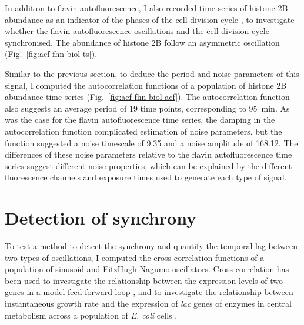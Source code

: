 In addition to flavin autofluorescence, I also recorded time series of histone 2B abundance as an indicator of the phases of the cell division cycle \parencite{garmendia-torresMultipleInputsEnsure2018}, to investigate whether the flavin autofluorescence oscillations and the cell division cycle synchronised.
The abundance of histone 2B follow an asymmetric oscillation (Fig.\ \ref{fig:acf-fhn-biol-ts}).

Similar to the previous section, to deduce the period and noise parameters of this signal, I computed the autocorrelation functions of a population of histone 2B abundance time series (Fig.\ \ref{fig:acf-fhn-biol-acf}).
The autocorrelation function also suggests an average period of 19 time points, corresponding to \SI{95}{\minute}.
As was the case for the flavin autofluorescence time series, the damping in the autocorrelation function complicated estimation of noise parameters, but the function suggested a noise timescale of 9.35 and a noise amplitude of 168.12.
The differences of these noise parameters relative to the flavin autofluorescence time series suggest different noise properties, which can be explained by the different fluorescence channels and exposure times used to generate each type of signal.


\section{Detection of synchrony}
\label{sec:analysis-correlation}

To test a method to detect the synchrony and quantify the temporal lag between two types of oscillations, I computed the cross-correlation functions of a population of sinusoid and FitzHugh-Nagumo oscillators.
Cross-correlation has been used to investigate the relationship between the expression levels of two genes in a model feed-forward loop \parencite{dunlopRegulatoryActivityRevealed2008},
and to investigate the relationship between instantaneous growth rate and the expression of \textit{lac} genes of enzymes in central metabolism across a population of \textit{E. coli} cells \parencite{kivietStochasticityMetabolismGrowth2014}.

